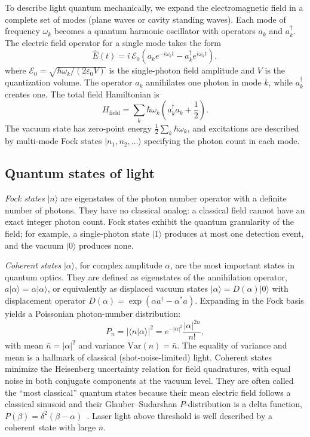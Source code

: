 \documentclass[12pt]{iopart}
\begin{document}
To describe light quantum mechanically, we expand the electromagnetic field in a complete set of modes (plane waves or cavity standing waves). Each mode of frequency $\omega_k$ becomes a quantum harmonic oscillator with operators $a_k$ and $a_k^\dagger$. The electric field operator for a single mode takes the form
\begin{equation}
\hat{E}(t) = i\, \mathcal{E}_0 \left( a_k e^{-i \omega_k t} - a_k^\dagger e^{i \omega_k t} \right),
\label{eq:efield}
\end{equation}
where $\mathcal{E}_0 = \sqrt{\hbar \omega_k / (2 \varepsilon_0 V)}$ is the single-photon field amplitude and $V$ is the quantization volume. The operator $a_k$ annihilates one photon in mode $k$, while $a_k^\dagger$ creates one. The total field Hamiltonian is
\begin{equation}
H_{\text{field}} = \sum_k \hbar \omega_k \left( a_k^\dagger a_k + \frac{1}{2} \right).
\label{eq:Hfield}
\end{equation}
The vacuum state has zero-point energy $\tfrac{1}{2} \sum_k \hbar \omega_k$, and excitations are described by multi-mode Fock states $|n_1, n_2, \ldots\rangle$ specifying the photon count in each mode.


\subsection{Quantum states of light}
\label{sec:states}

\textit{Fock states} $|n\rangle$ are eigenstates of the photon number operator with a definite number of photons. They have no classical analog: a classical field cannot have an exact integer photon count. Fock states exhibit the quantum granularity of the field; for example, a single-photon state $|1\rangle$ produces at most one detection event, and the vacuum $|0\rangle$ produces none.

\textit{Coherent states} $|\alpha\rangle$, for complex amplitude $\alpha$, are the most important states in quantum optics. They are defined as eigenstates of the annihilation operator, $a|\alpha\rangle = \alpha|\alpha\rangle$, or equivalently as displaced vacuum states $|\alpha\rangle = D(\alpha)|0\rangle$ with displacement operator $D(\alpha) = \exp(\alpha a^\dagger - \alpha^* a)$. Expanding in the Fock basis yields a Poissonian photon-number distribution:
\begin{equation}
P_n = |\langle n|\alpha\rangle|^2 = e^{-|\alpha|^2} \frac{|\alpha|^{2n}}{n!},
\label{eq:poisson}
\end{equation}
with mean $\bar{n} = |\alpha|^2$ and variance $\text{Var}(n) = \bar{n}$. The equality of variance and mean is a hallmark of classical (shot-noise-limited) light. Coherent states minimize the Heisenberg uncertainty relation for field quadratures, with equal noise in both conjugate components at the vacuum level. They are often called the ``most classical'' quantum states because their mean electric field follows a classical sinusoid and their Glauber--Sudarshan $P$-distribution is a delta function, $P(\beta) = \delta^2(\beta - \alpha)$~\cite{glauber1963}. Laser light above threshold is well described by a coherent state with large $\bar{n}$.
\end{document}

